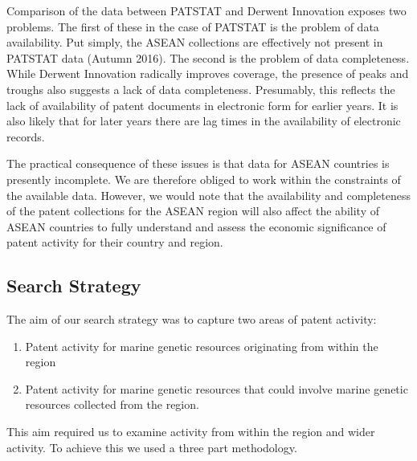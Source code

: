 \documentclass[]{book}
\providecommand{\tightlist}{%
  \setlength{\itemsep}{0pt}\setlength{\parskip}{0pt}}
\theoremstyle{definition}
\theoremstyle{definition}
\theoremstyle{definition}
\theoremstyle{remark}
\begin{document}
Comparison of the data between PATSTAT and Derwent Innovation exposes
two problems. The first of these in the case of PATSTAT is the problem
of data availability. Put simply, the ASEAN collections are effectively
not present in PATSTAT data (Autumn 2016). The second is the problem of
data completeness. While Derwent Innovation radically improves coverage,
the presence of peaks and troughs also suggests a lack of data
completeness. Presumably, this reflects the lack of availability of
patent documents in electronic form for earlier years. It is also likely
that for later years there are lag times in the availability of
electronic records.

The practical consequence of these issues is that data for ASEAN
countries is presently incomplete. We are therefore obliged to work
within the constraints of the available data. However, we would note
that the availability and completeness of the patent collections for the
ASEAN region will also affect the ability of ASEAN countries to fully
understand and assess the economic significance of patent activity for
their country and region.

\hypertarget{search-strategy}{%
\subsection{Search Strategy}\label{search-strategy}}

The aim of our search strategy was to capture two areas of patent
activity:

\begin{enumerate}
\def\labelenumi{\arabic{enumi}.}
\tightlist
\item
  Patent activity for marine genetic resources originating from within
  the region
\item
  Patent activity for marine genetic resources that could involve marine
  genetic resources collected from the region.
\end{enumerate}

This aim required us to examine activity from within the region and
wider activity. To achieve this we used a three part methodology.
\end{document}
